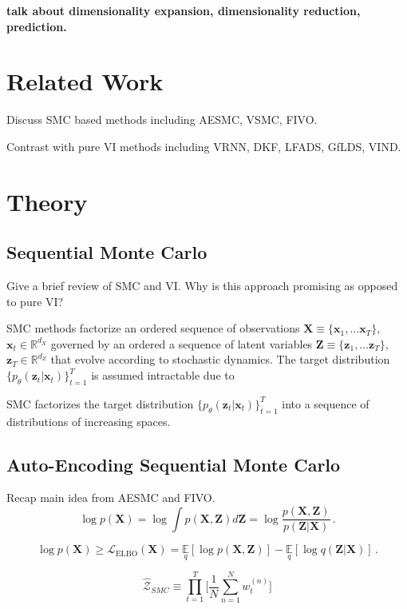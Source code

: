 \documentclass{article}
\newcommand{\be}{\begin{equation}}
\newcommand{\ee}{\end{equation}}
\newcommand{\trm}[1]{\textrm{#1}}
\newcommand{\mbf}[1]{\mathbf{#1}}
\newcommand{\mbb}[1]{\mathbb{#1}}
\newcommand{\msc}[1]{\mathscr{#1}}
\newcommand{\bx}{\mbf{x}}
\newcommand{\bX}{\mbf{X}}
\newcommand{\bZ}{\mbf{Z}}
\newcommand{\bz}{\mbf{z}}
\begin{document}
\textbf{talk about dimensionality expansion, dimensionality reduction, prediction.}

\section{Related Work}
Discuss SMC based methods including AESMC, VSMC, FIVO. 

Contrast with pure VI methods including VRNN, DKF, LFADS, GfLDS, VIND. 


\section{Theory}
\subsection{Sequential Monte Carlo}
Give a brief review of SMC and VI. Why is this approach promising as opposed to pure VI?

SMC methods factorize an ordered sequence of observations $\bX \equiv \{\bx_1,\dots\bx_T\}$, $\bx_t\in\mbb{R}^{d_X}$ governed by an ordered a sequence of latent variables $\bZ\equiv\{\bz_1,\dots\bz_T\}$, $\bz_T\in \mbb{R}^{d_Z}$ that evolve according to stochastic dynamics. The target distribution $\{p_{\theta}(\bz_t|\bx_t)\}_{t=1}^{T}$ is assumed intractable due to 

SMC factorizes the target distribution $\{p_{\theta}(\bz_t|\bx_t)\}_{t=1}^{T}$ into a sequence of distributions of increasing spaces. 


\subsection{Auto-Encoding Sequential Monte Carlo}
Recap main idea from AESMC and FIVO. 
\be
\log p(\bX) = \log \int p(\bX, \bZ) d\bZ = \log \frac{p(\bX, \bZ)}{p(\bZ|\bX)} \,. \label{ll}
\ee


\be
\log p(\bX) \geq \msc{L}_{\trm{ELBO}}(\bX) = \underset{q}{\mbb{E}}[\log p(\bX, \bZ)] - \underset{q}{\mbb{E}} [\log q(\bZ|\bX)] \label{ELBO} \,.
\ee


\be
\hat{\mathcal{Z}}_{SMC} \equiv \prod\limits_{t=1}^{T}\Big[\frac{1}{N}\sum\limits_{n=1}^{N}w_t^{(n)} \Big] 
\ee
\end{document}
